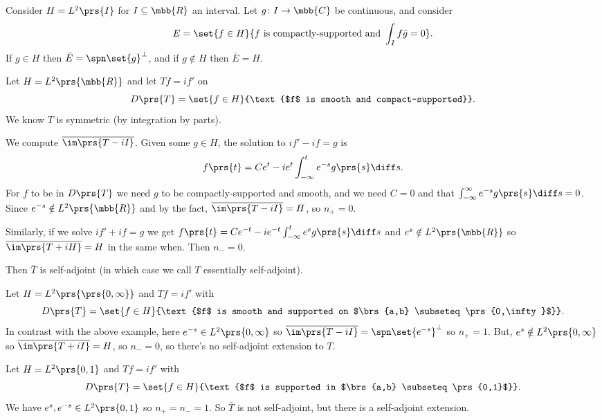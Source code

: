 \documentclass[10pt, twoside]{book}
\begin{document}
\begin{fact}
Consider $H = L^2\prs{I}$ for $I \subseteq \mbb{R}$ an interval. Let $g \colon I \to \mbb{C}$ be continuous, and consider \[E = \set{f \in H}{f \text{ is compactly-supported and } \int_I f \bar{g} = 0} \text{.}\]
If $g \in H$ then $\bar{E} = \spn\set{g}^\perp$, and if $g \notin H$ then $\bar{E} = H$.
\end{fact}

\begin{example}
Let $H = L^2\prs{\mbb{R}}$ and let $Tf = if'$ on
\[D\prs{T} = \set{f \in H}{\text{$f$ is smooth and compact-supported}} \text{.}\]
We know $T$ is symmetric (by integration by parts).

We compute $\overline{\im\prs{T-iI}}$. Given some $g \in H$, the solution to $if' - if = g$ is \[f\prs{t} = Ce^t -ie^t \int_{-\infty}^t e^{-s} g\prs{s} \diff s \text{.}\]
For $f$ to be in $D\prs{T}$ we need $g$ to be compactly-supported and smooth, and we need $C = 0$ and that $\int_{-\infty}^{\infty} e^{-s} g\prs{s} \diff s = 0$.
Since $e^{-s} \notin L^2\prs{\mbb{R}}$ and by the fact, $\overline{\im\prs{T-iI}} = H$, so $n_+ = 0$.

Similarly, if we solve $if' + if = g$ we get $f\prs{t} = Ce^{-t} - ie^{-t}\int_{-\infty}^t e^s g\prs{s} \diff s$ and $e^s \notin L^2\prs{\mbb{R}}$ so $\overline{\im\prs{T + iH}} = H$ in the same when. Then $n_- = 0$.

Then $\bar{T}$ is self-adjoint (in which case we call $T$ essentially self-adjoint).
\end{example}

\begin{example}
Let $H = L^2\prs{\prs{0,\infty}}$ and $Tf = if'$ with
\[D\prs{T} = \set{f \in H}{\text{$f$ is smooth and supported on $\brs{a,b} \subseteq \prs{0,\infty}$}} \text{.}\]
In contrast with the above example, here $e^{-s} \in L^2\prs{0,\infty}$ so $\overline{\im\prs{T - iI}} = \spn\set{e^{-s}}^\perp$ so $n_+ = 1$. But, $e^{s} \notin L^2\prs{0,\infty}$ so $\overline{\im\prs{T + iI}} = H$, so $n_- = 0$, so there's no self-adjoint extension to $T$.
\end{example}

\begin{example}
Let $H = L^2\prs{0,1}$ and $Tf = if'$ with
\[D\prs{T} = \set{f \in H}{\text{$f$ is supported in $\brs{a,b} \subseteq \prs{0,1}$}} \text{.}\]
We have $e^s, e^{-s} \in L^2\prs{0,1}$ so $n_+ = n_- = 1$. So $\bar{T}$ is not self-adjoint, but there is a self-adjoint extension.
\end{example}
\end{document}
